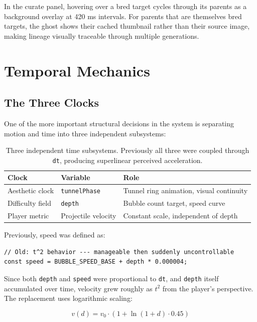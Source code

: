 \documentclass[12pt, a4paper]{article}
\begin{document}
In the curate panel, hovering over a bred target cycles through its parents as a background overlay at 420 ms intervals. For parents that are themselves bred targets, the ghost shows their cached thumbnail rather than their source image, making lineage visually traceable through multiple generations.

\section{Temporal Mechanics}

\subsection{The Three Clocks}

One of the more important structural decisions in the system is separating motion and time into three independent subsystems:

\begin{table}[H]
\centering
\begin{tabular}{lll}
\toprule
\textbf{Clock} & \textbf{Variable} & \textbf{Role} \\
\midrule
Aesthetic clock & \texttt{tunnelPhase} & Tunnel ring animation, visual continuity \\
Difficulty field & \texttt{depth} & Bubble count target, speed curve \\
Player metric & Projectile velocity & Constant scale, independent of depth \\
\bottomrule
\end{tabular}
\caption{Three independent time subsystems. Previously all three were coupled through \texttt{dt}, producing superlinear perceived acceleration.}
\end{table}

Previously, speed was defined as:

\begin{lstlisting}[language={}]
// Old: t^2 behavior --- manageable then suddenly uncontrollable
const speed = BUBBLE_SPEED_BASE + depth * 0.000004;
\end{lstlisting}

Since both \texttt{depth} and \texttt{speed} were proportional to \texttt{dt}, and \texttt{depth} itself accumulated over time, velocity grew roughly as $t^2$ from the player's perspective. The replacement uses logarithmic scaling:

\begin{equation}
v(d) = v_0 \cdot (1 + \ln(1 + d) \cdot 0.45)
\end{equation}
\end{document}
